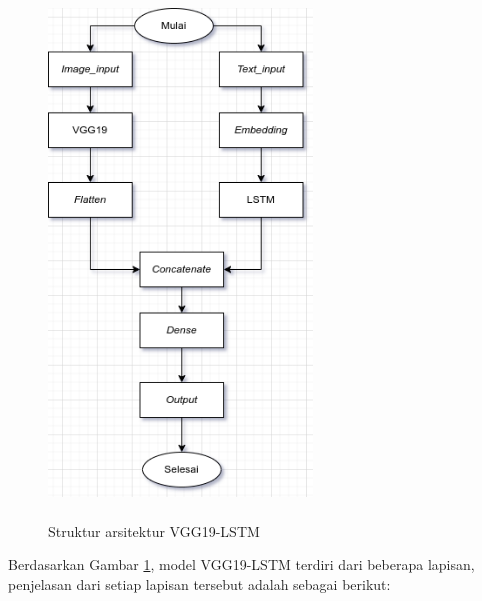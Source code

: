 \begin{figure}[H]
  \centering
  \includegraphics[width = 7cm, height= 14cm]{image/bab4/vgg19-lstm-struktur.png}
  \caption{Struktur arsitektur VGG19-LSTM}
  \label{fig:struktur-arstektur-vgg19-lstm}
\end{figure}

\par Berdasarkan Gambar \ref{fig:struktur-arstektur-vgg19-lstm}, model VGG19-LSTM terdiri dari beberapa lapisan, penjelasan dari setiap lapisan tersebut adalah sebagai berikut:

